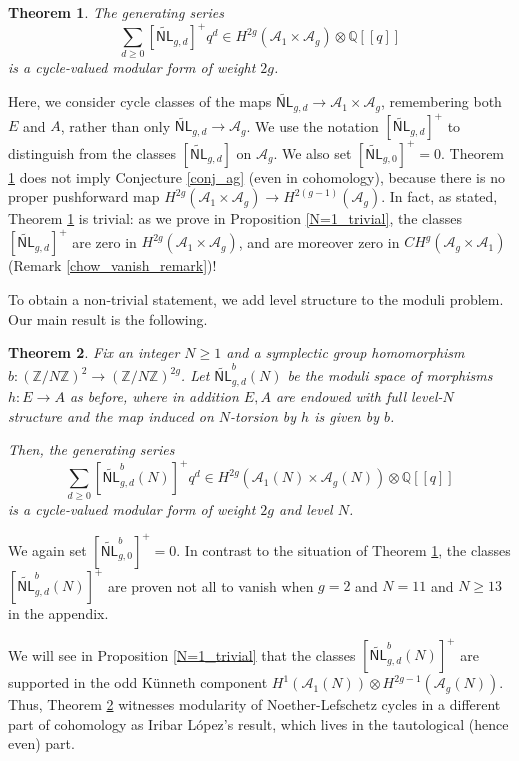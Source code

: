 \documentclass[12pt]{amsart}
\def\cA{\mathcal{A}}
\def\bQ{\mathbb{Q}}
\def\bZ{\mathbb{Z}}
\newcommand{\wNL}{{\widetilde{\mathsf{NL}}}}
\newtheorem{thm}{Theorem}[section]
\theoremstyle{definition}
\begin{document}
\begin{thm}\label{thm_trivial}
        The generating series
    \begin{equation*}
        \sum_{d\ge 0}[\wNL_{g,d}]^+q^d \in  H^{2g}(\cA_1\times \cA_g)\otimes \bQ[[q]]
    \end{equation*}
    is a cycle-valued modular form of weight $2g$. 
\end{thm}
Here, we consider cycle classes of the maps $\wNL_{g,d}\to \cA_1\times \cA_g$, remembering both $E$ and $A$, rather than only $\wNL_{g,d}\to \cA_g$. We use the notation $[\wNL_{g,d}]^+$ to distinguish from the classes $[\wNL_{g,d}]$ on $\cA_g$. We also set $[\wNL_{g,0}]^+=0$. Theorem \ref{thm_trivial} does not imply Conjecture \ref{conj_ag} (even in cohomology), because there is no proper pushforward map $H^{2g}(\cA_1\times \cA_g)\to H^{2(g-1)}(\cA_g)$. In fact, as stated, Theorem \ref{thm_trivial} is trivial: as we prove in Proposition \ref{N=1_trivial}, the classes $[\wNL_{g,d}]^+$ are zero in $H^{2g}(\cA_1\times \cA_g)$, and are moreover zero in $CH^g(\cA_g\times \cA_1)$ (Remark \ref{chow_vanish_remark})!

To obtain a non-trivial statement, we add level structure to the moduli problem. Our main result is the following.
\begin{thm}\label{thm_levelN}
Fix an integer $N\ge1$ and a symplectic group homomorphism $b:(\bZ/N\bZ)^2\to (\bZ/N\bZ)^{2g}$. Let $\wNL^b_{g,d}(N)$ be the moduli space of morphisms $h:E\to A$ as before, where in addition $E,A$ are endowed with full level-$N$ structure and the map induced on $N$-torsion by $h$ is given by $b$.

Then, the generating series
    \begin{equation*}
        \sum_{d\ge 0}[\wNL^b_{g,d}(N)]^+q^d \in  H^{2g}(\cA_1(N)\times \cA_g(N))\otimes \bQ[[q]]
    \end{equation*}
    is a cycle-valued modular form of weight $2g$ and level $N$.
\end{thm}

We again set $[\wNL^b_{g,0}]^+=0$. In contrast to the situation of Theorem \ref{thm_trivial}, the classes $[\wNL^b_{g,d}(N)]^+$ are proven not all to vanish when $g=2$ and $N=11$ and $N\ge13$ in the appendix.

We will see in Proposition \ref{N=1_trivial} that the classes $[\wNL^b_{g,d}(N)]^+$ are supported in the odd K\"{u}nneth component $H^1(\cA_1(N))\otimes H^{2g-1}(\cA_g(N))$. Thus, Theorem \ref{thm_levelN} witnesses modularity of Noether-Lefschetz cycles in a different part of cohomology as Iribar L\'{o}pez's result, which lives in the tautological (hence even) part.
\end{document}
